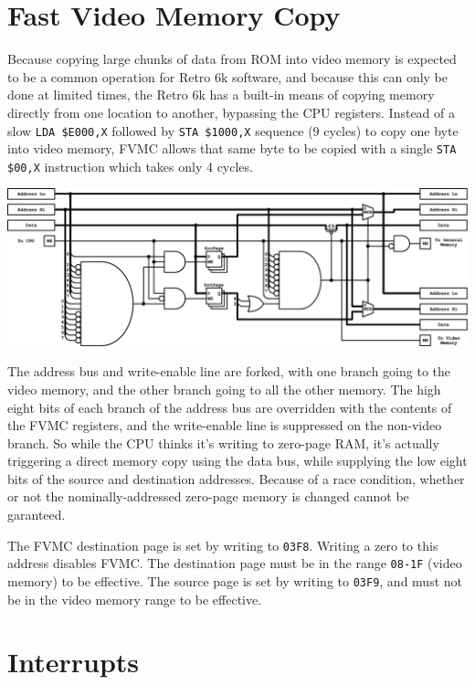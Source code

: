 \documentclass[12pt]{{memoir}}
\begin{document}
\section{Fast Video Memory Copy}
\label{sec:fvmc}

Because copying large chunks of data from ROM into video memory is expected to be a common operation for Retro 6k software, and because this can only be done at limited times, the Retro 6k has a built-in means of copying memory directly from one location to another, bypassing the CPU registers. Instead of a slow \texttt{LDA \$E000,X} followed by \texttt{STA \$1000,X} sequence (9 cycles) to copy one byte into video memory, FVMC allows that same byte to be copied with a single \texttt{STA \$00,X} instruction which takes only 4 cycles.

\begin{center}\includegraphics[width=\textwidth]{fvmc}\end{center}

The address bus and write-enable line are forked, with one branch going to the video memory, and the other branch going to all the other memory. The high eight bits of each branch of the address bus are overridden with the contents of the FVMC registers, and the write-enable line is suppressed on the non-video branch. So while the CPU thinks it's writing to zero-page RAM, it's actually triggering a direct memory copy using the data bus, while supplying the low eight bits of the source and destination addresses. Because of a race condition, whether or not the nominally-addressed zero-page memory is changed cannot be garanteed.

The FVMC destination page is set by writing to \texttt{03F8}. Writing a zero to this address disables FVMC. The destination page must be in the range \texttt{08-1F} (video memory) to be effective. The source page is set by writing to \texttt{03F9}, and must not be in the video memory range to be effective.

\section{Interrupts}
\end{document}
